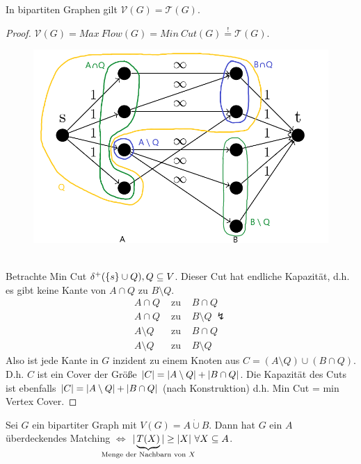 \begin{satz}
	In bipartiten Graphen gilt $\mathcal{V}(G) = \mathcal{T}(G)$.
\end{satz}
\begin{proof}
	$\mathcal{V}(G) = Max~Flow(G) = Min~Cut(G) \overset{!}{=} \mathcal{T}(G)$. 
		\begin{figure}[ht]
			\begin{center}
				\includegraphics[scale=.3]{satz_5_8.png}
			\end{center}
		\end{figure}\\
	Betrachte Min Cut $\delta^+(\{s\}\cup Q), Q \subseteq V$. Dieser Cut hat endliche Kapazität, d.h. es gibt keine Kante von $A \cap Q$ zu $B\setminus Q$.
	\begin{eqnarray*}
		A \cap Q & \text{ zu } & B \cap Q\\
		A \cap Q & \text{ zu } & B \setminus Q ~\lightning\\
		A \setminus Q & \text{ zu } & B \cap Q\\
		A \setminus Q & \text{ zu } & B \setminus Q
	\end{eqnarray*}
	Also ist jede Kante in $G$ inzident zu einem Knoten aus $C = (A\setminus Q)\cup (B \cap Q)$. D.h. $C$ ist ein Cover der Größe $\vert C \vert = \vert A\setminus Q \vert + \vert B\cap Q \vert$. Die Kapazität des Cuts ist ebenfalls $\vert C \vert = \vert A\setminus Q \vert + \vert B\cap Q \vert$ (nach Konstruktion) d.h. Min Cut = min Vertex Cover.
\end{proof}
\begin{satz}
	Sei $G$ ein bipartiter Graph mit $V(G)=A\dot\cup B$. Dann hat $G$ ein $A$ überdeckendes Matching $\Leftrightarrow$ $\card{\underbrace{T(X)}_{\mathclap{\text{Menge der Nachbarn von } X}}} \ge \card{X}~\forall X\subseteq A$.
\end{satz}
